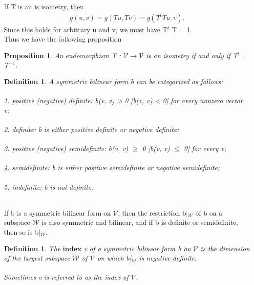 \documentclass[12pt,a4paper]{article}
\newtheorem{defn}[thm]{Definition}
\newtheorem{prop}{Proposition}
\begin{document}
If T is an is isometry, then
\begin{align*}
g(u, v) = g(Tu, Tv) = g(T^t Tu, v).
\end{align*}
Since this holds for arbitrary u and v, we must have T$^t$
T = 1.\\ Thus we have the following proposition
\begin{prop}
An endomorphism T : $\mathcal{V}$$\to$$\mathcal{V}$ is an isometry if and only
if T$^t$ = T$^{-1}$.
\end{prop}
\begin{defn} 
A symmetric bilinear form b can be categorized as follows:
\\\\
1. positive (negative) definite: b(v, v) > 0 [b(v, v) < 0] for every
nonzero vector v;\\\\
2. definite: b is either positive definite or negative definite;\\\\
3. positive (negative) semidefinite: b(v, v) $\geq$ 0 [b(v, v) $\leq$ 0] for every v;\\\\
4. semidefinite: b is either positive semidefinite or negative semidefinite;\\\\
5. indefinite: b is not definite.\\\\
\end{defn}
If b is a symmetric bilinear form on $\mathcal{V}$, then the restriction b|$_\mathcal{W}$ of b on a
subspace $\mathcal{W}$ is also symmetric and bilinear, and if b is definite or semidefinite, then so is b|$_\mathcal{W}$.
\begin{defn}
The $\textbf{index}$ v of a symmetric bilinear form b on $\mathcal{V}$ is the
dimension of the largest subspace $\mathcal{W}$ of $\mathcal{V}$ on which b|$_\mathcal{W}$ is negative definite.\\\\
Sometimes v is referred to as the index of $\mathcal{V}$.
\end{defn}
\end{document}

